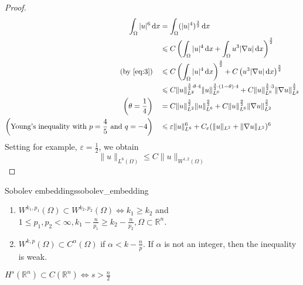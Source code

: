\documentclass{report}
\begin{document}
\begin{proof}
    \begin{align*}
        \int_{\Omega} \vert u \vert^{6} \,\mathrm{d}x &= \int_{\Omega} (\vert u \vert^{4})^{\frac{3}{2}} \,\mathrm{d}x \\
        &\leq C \left(\int_{\Omega} \vert u \vert^{4} \,\mathrm{d}x + \int_{\Omega} u^{3}|\nabla u| \,\mathrm{d}x \right)^{\frac{3}{2}} \\
        (\text{by \eqref{eq:3}}) \quad &\leq C \left(\int_{\Omega} \vert u \vert^{4} \,\mathrm{d}x\right)^{\frac{3}{2}} + C \left(u^{3}|\nabla u| \,\mathrm{d}x \right)^{\frac{3}{2}} \\
        &\leq C \|u\|^{\frac{3}{2}\cdot \theta \cdot 4}_{L^{2}} \|u\|^{\frac{3}{2}\cdot (1-\theta) \cdot 4}_{L^{6}} + C \|u\|^{\frac{3}{2}\cdot 3}_{L^{6}} \|\nabla u\|^{\frac{3}{2}}_{L^{2}} \\
        \left(\theta = \frac{1}{4}\right) \quad &= C \|u\|^{\frac{3}{2}}_{L^{2}} \|u\|^{\frac{9}{2}}_{L^{6}} + C\|u\|^{\frac{9}{2}}_{L^{6}} \|\nabla u\|^{\frac{3}{2}}_{L^{2}} \\
        \left(\text{Young's inequality with } p=\frac{4}{5} \text{ and }q=-4\right) \quad &\leq \varepsilon \|u\|^{6}_{L^{6}} + C_{\varepsilon}(\|u\|_{L^{2}} + \|\nabla u\|_{L^{2}})^{6}
    \end{align*}
    Setting for example, \(\varepsilon = \frac{1}{2}\), we obtain
    \[\|u\|_{L^{6}(\Omega)} \leq C \|u\|_{W^{1, 2}(\Omega)}\]
\end{proof}

\begin{theorem}{Sobolev embeddings}{sobolev_embedding}
    \begin{enumerate}[label=\bfseries\tiny\protect\circled{\small\arabic*}]
		\item \(W^{k_1, p_1}(\Omega) \subset W^{k_2, p_2}(\Omega) \Longleftrightarrow k_1 \geq k_2\) and \(1 \leq p_1, p_2 < \infty, k_1 - \frac{n}{p_1} \geq k_2 - \frac{n}{p_2}, \Omega \subset \mathbb{R}^{n}\).
		\item \(W^{k,p}(\Omega) \subset C^{\alpha}(\Omega)\) if \(\alpha < k - \frac{n}{p}\). If \(\alpha\) is not an integer, then the inequality is weak.
	\end{enumerate}
\end{theorem}

\ex{}
{
    \(H^{s}(\mathbb{R}^{n}) \subset C(\mathbb{R}^{n}) \iff s > \frac{n}{2} \) 
}
\end{document}
